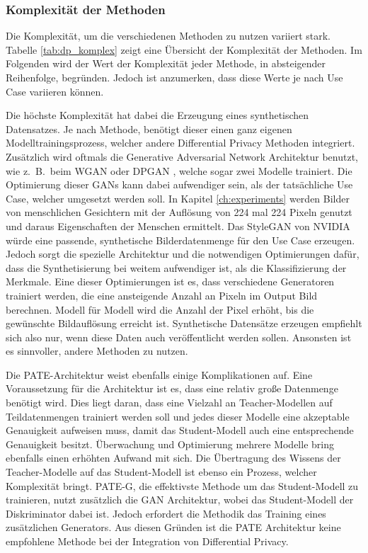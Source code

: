 \subsubsection*{Komplexität der Methoden}

Die Komplexität, um die verschiedenen Methoden zu nutzen variiert stark.
Tabelle \ref{tab:dp_komplex} zeigt eine Übersicht der Komplexität der Methoden.
Im Folgenden wird der Wert der Komplexität jeder Methode, in absteigender Reihenfolge, begründen.
Jedoch ist anzumerken, dass diese Werte je nach Use Case variieren können.


Die höchste Komplexität hat dabei die Erzeugung eines synthetischen Datensatzes.
Je nach Methode, benötigt dieser einen ganz eigenen Modelltrainingsprozess, welcher andere Differential Privacy Methoden integriert.
Zusätzlich wird oftmals die Generative Adversarial Network Architektur benutzt, wie z.\ B.\  beim WGAN \cite{P-92} oder DPGAN \cite{P-70}, welche sogar zwei Modelle trainiert.
Die Optimierung dieser GANs kann dabei aufwendiger sein, als der tatsächliche Use Case, welcher umgesetzt werden soll. 
In Kapitel \ref{ch:experiments} werden Bilder von menschlichen Gesichtern mit der Auflösung von 224 mal 224 Pixeln genutzt und daraus Eigenschaften der Menschen ermittelt. 
Das StyleGAN von NVIDIA \cite{P-108} würde eine passende, synthetische Bilderdatenmenge für den Use Case erzeugen.
Jedoch sorgt die spezielle Architektur und die notwendigen Optimierungen dafür, dass die Synthetisierung bei weitem aufwendiger ist, als die Klassifizierung der Merkmale.
Eine dieser Optimierungen ist es, dass verschiedene Generatoren trainiert werden, die eine ansteigende Anzahl an Pixeln im Output Bild berechnen.
Modell für Modell wird die Anzahl der Pixel erhöht, bis die gewünschte Bildauflösung erreicht ist.
Synthetische Datensätze erzeugen empfiehlt sich also nur, wenn diese Daten auch veröffentlicht werden sollen.
Ansonsten ist es sinnvoller, andere Methoden zu nutzen.

Die PATE-Architektur \cite{P-57} weist ebenfalls einige Komplikationen auf.
Eine Voraussetzung für die Architektur ist es, dass eine relativ große Datenmenge benötigt wird. 
Dies liegt daran, dass eine Vielzahl an Teacher-Modellen auf Teildatenmengen trainiert werden soll und jedes dieser Modelle eine akzeptable Genauigkeit aufweisen muss, damit das Student-Modell auch eine entsprechende Genauigkeit besitzt.
Überwachung und Optimierung mehrere Modelle bring ebenfalls einen erhöhten Aufwand mit sich.
Die Übertragung des Wissens der Teacher-Modelle auf das Student-Modell ist ebenso ein Prozess, welcher Komplexität bringt.
PATE-G, die effektivste Methode um das Student-Modell zu trainieren, nutzt zusätzlich die GAN Architektur, wobei das Student-Modell der Diskriminator dabei ist.
Jedoch erfordert die Methodik das Training eines zusätzlichen Generators.
Aus diesen Gründen ist die PATE Architektur keine empfohlene Methode bei der Integration von Differential Privacy.

